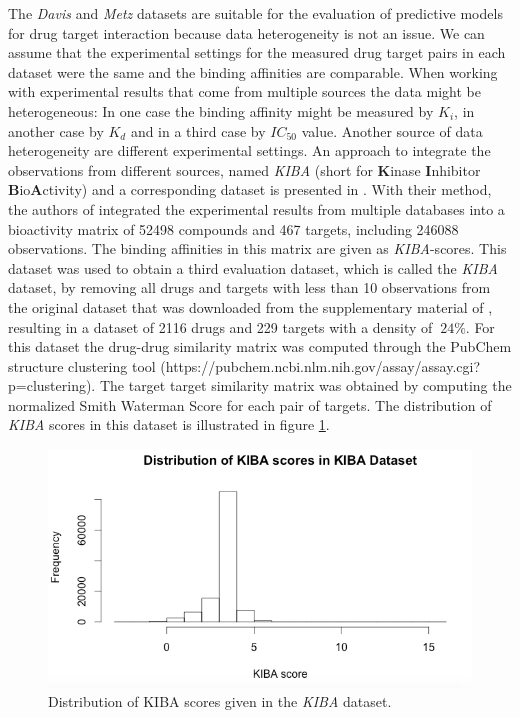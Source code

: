 The \textit{Davis} and \textit{Metz} datasets are suitable for the evaluation of predictive models for drug target interaction because data heterogeneity is not an issue. We can assume that the experimental settings for the measured drug target pairs in each dataset were the same and the binding affinities are comparable. When working with experimental results that come from multiple sources the data might be heterogeneous: In one case the binding affinity might be measured by $K_i$, in another case by $K_d$ and in a third case by $IC_{50}$ value. Another source of data heterogeneity are different experimental settings. An approach to integrate the observations from different sources, named \textit{KIBA} (short for \textbf{K}inase \textbf{I}nhibitor \textbf{B}io\textbf{A}ctivity) and a corresponding dataset is presented in \cite{tang2014making}. With their method, the authors of \cite{tang2014making} integrated the experimental results from multiple databases into a bioactivity matrix of 52498 compounds and 467 targets, including 246088 observations. The binding affinities in this matrix are given as \textit{KIBA}-scores. This dataset was used to obtain a third evaluation dataset, which is called the \textit{KIBA} dataset, by removing all drugs and targets with less than 10 observations from the original dataset that was downloaded from the supplementary material of \cite{tang2014making}, resulting in a dataset of 2116 drugs and 229 targets with a density of $~24\%$. For this dataset the drug-drug similarity matrix was computed through the PubChem structure clustering tool (https://pubchem.ncbi.nlm.nih.gov/assay/assay.cgi?p=clustering). The target target similarity matrix was obtained by computing the normalized Smith Waterman Score \cite{yamanishi2010drug} for each pair of targets. The distribution of \textit{KIBA} scores in this dataset is illustrated in figure \ref{fig:kiba_dist}.

\begin{figure}
\begin{center}
\includegraphics[scale=0.6]{kiba_dist.png}
\end{center}
\caption{Distribution of KIBA scores given in the \textit{KIBA} dataset.}
\label{fig:kiba_dist}
\end{figure}

